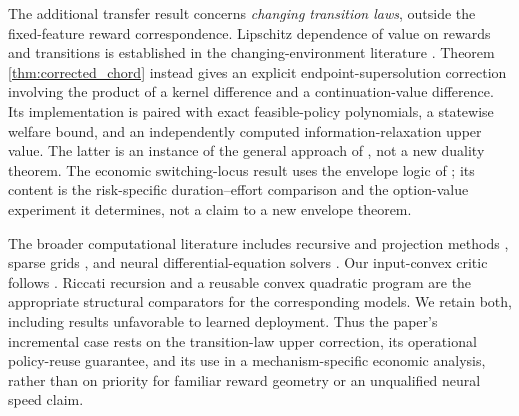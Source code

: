 The additional transfer result concerns \emph{changing transition laws}, outside the fixed-feature reward correspondence. Lipschitz dependence of value on rewards and transitions is established in the changing-environment literature \citep{csaji2008}. Theorem \ref{thm:corrected_chord} instead gives an explicit endpoint-supersolution correction involving the product of a kernel difference and a continuation-value difference. Its implementation is paired with exact feasible-policy polynomials, a statewise welfare bound, and an independently computed information-relaxation upper value. The latter is an instance of the general approach of \citet{brown2010}, not a new duality theorem. The economic switching-locus result uses the envelope logic of \citet{milgrom2002}; its content is the risk-specific duration--effort comparison and the option-value experiment it determines, not a claim to a new envelope theorem.

The broader computational literature includes recursive and projection methods \citep{stokey1989,judd1998}, sparse grids \citep{brumm2017}, and neural differential-equation solvers \citep{raissi2019,han2018}. Our input-convex critic follows \citet{amos2017}. Riccati recursion and a reusable convex quadratic program are the appropriate structural comparators for the corresponding models. We retain both, including results unfavorable to learned deployment. Thus the paper's incremental case rests on the transition-law upper correction, its operational policy-reuse guarantee, and its use in a mechanism-specific economic analysis, rather than on priority for familiar reward geometry or an unqualified neural speed claim.
